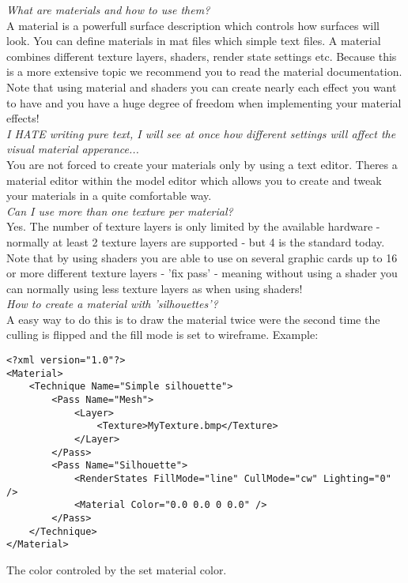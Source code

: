 \emph{What are materials and how to use them?}\\
A material is a powerfull surface description which controls how surfaces will look. You can define
materials in mat files which simple text files. A material combines different texture layers, shaders,
render state settings etc. Because this is a more extensive topic we recommend you to read the material
documentation. Note that using material and shaders you can create nearly each effect you want to have
and you have a huge degree of freedom when implementing your material effects!\\


\emph{I HATE writing pure text, I will see at once how different settings will affect the visual material
  apperance...}\\
You are not forced to create your materials only by using a text editor. Theres a material editor
within the model editor which allows you to create and tweak your materials in a quite comfortable
way.\\


\emph{Can I use more than one texture per material?}\\
Yes. The number of texture layers is only limited by the available hardware - normally at least 2
texture layers are supported - but 4 is the standard today. Note that by using shaders you are
able to use on several graphic cards up to 16 or more different texture layers - 'fix pass' - meaning
without using a shader you can normally using less texture layers as when using shaders!\\


\emph{How to create a material with 'silhouettes'?}\\
A easy way to do this is to draw the material twice were the second time the culling is flipped and
the fill mode is set to wireframe. Example:\\

\begin{lstlisting}[caption=Silhouette material]
<?xml version="1.0"?>
<Material>
	<Technique Name="Simple silhouette">
		<Pass Name="Mesh">
			<Layer>
				<Texture>MyTexture.bmp</Texture>
			</Layer>
		</Pass>
		<Pass Name="Silhouette">
			<RenderStates FillMode="line" CullMode="cw" Lighting="0" />
			<Material Color="0.0 0.0 0 0.0" />
		</Pass>
	</Technique>
</Material>
\end{lstlisting}

The color controled by the set material color.\\



